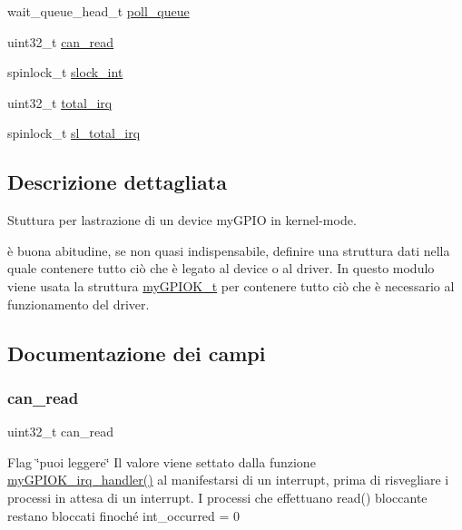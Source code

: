 \begin{DoxyCompactItemize}
\item 
wait\+\_\+queue\+\_\+head\+\_\+t \hyperlink{structmy_g_p_i_o_k__t_a2080617f88cafd765430573afe7701d1}{poll\+\_\+queue}
\item 
uint32\+\_\+t \hyperlink{structmy_g_p_i_o_k__t_a2b8d3d6037e2d2fdadbd7c2fd995f0a1}{can\+\_\+read}
\item 
spinlock\+\_\+t \hyperlink{structmy_g_p_i_o_k__t_a1e1ddf972b4dc84dd331a0c72e5d9895}{slock\+\_\+int}
\item 
uint32\+\_\+t \hyperlink{structmy_g_p_i_o_k__t_a2da711ac290a9613b8d8af97f122b997}{total\+\_\+irq}
\item 
spinlock\+\_\+t \hyperlink{structmy_g_p_i_o_k__t_ac41bbc7fe03ef25b7f468275fb565d78}{sl\+\_\+total\+\_\+irq}
\end{DoxyCompactItemize}


\subsection{Descrizione dettagliata}
Stuttura per l\textquotesingle{}astrazione di un device my\+G\+P\+IO in kernel-\/mode. 

è buona abitudine, se non quasi indispensabile, definire una struttura dati nella quale contenere tutto ciò che è legato al device o al driver. In questo modulo viene usata la struttura \hyperlink{structmy_g_p_i_o_k__t}{my\+G\+P\+I\+O\+K\+\_\+t} per contenere tutto ciò che è necessario al funzionamento del driver. 

\subsection{Documentazione dei campi}
\mbox{\label{structmy_g_p_i_o_k__t_a2b8d3d6037e2d2fdadbd7c2fd995f0a1}} 
\subsubsection{\texorpdfstring{can\+\_\+read}{can\_read}}
{\footnotesize\ttfamily uint32\+\_\+t can\+\_\+read}

Flag \char`\"{}puoi leggere\char`\"{} Il valore viene settato dalla funzione \hyperlink{group___linux-_driver_ga2fc230a12a97aa63e43b2dc4aec73511}{my\+G\+P\+I\+O\+K\+\_\+irq\+\_\+handler()} al manifestarsi di un interrupt, prima di risvegliare i processi in attesa di un interrupt. I processi che effettuano read() bloccante restano bloccati finoché int\+\_\+occurred = 0 \mbox{\label{structmy_g_p_i_o_k__t_acba682fe45d5a1501790dbdb1d99bd6a}} 
